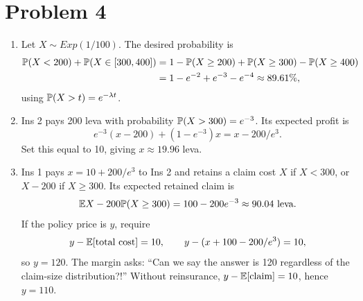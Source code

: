 \documentclass[a4paper]{article}
\begin{document}
\section*{Problem 4}
\begin{enumerate}
\item Let $X\sim Exp(1/100)$. The desired probability is
\begin{align*}
\P(X<200)+\P(X\in[300,400])
&=1-\P(X\ge200)+\P(X\ge300)-\P(X\ge400)\\
&=1-e^{-2}+e^{-3}-e^{-4}\approx89.61\%,
\end{align*}
using $\P(X>t)=e^{-\lambda t}$.
\item Ins 2 pays 200 leva with probability $\P(X>300)=e^{-3}$. Its expected profit is
\[e^{-3}(x-200)+(1-e^{-3})x=x-200/e^3.\]
Set this equal to 10, giving $x\approx19.96$ leva.
\item Ins 1 pays $x=10+200/e^3$ to Ins 2 and retains a claim cost $X$ if $X<300$, or $X-200$ if $X\ge300$. Its expected retained claim is
\[\E X-200\P(X\ge300)=100-200e^{-3}\approx90.04\text{ leva}.\]
If the policy price is $y$, require
\[y-\E[\text{total cost}]=10,\qquad y-(x+100-200/e^3)=10,\]
so $y=120$. The margin asks: ``Can we say the answer is 120 regardless of the claim-size distribution?!'' Without reinsurance, $y-\E[\text{claim}]=10$, hence $y=110$.
\end{enumerate}
\end{document}
